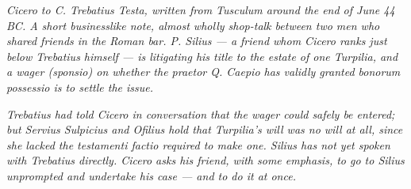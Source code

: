 
\textit{Cicero to C. Trebatius Testa, written from Tusculum around
the end of June 44 BC. A short businesslike note, almost wholly
shop-talk between two men who shared friends in the Roman bar.
P. Silius --- a friend whom Cicero ranks just below Trebatius
himself --- is litigating his title to the estate of one Turpilia,
and a wager (\textit{sponsio}) on whether the praetor Q. Caepio
has validly granted bonorum possessio is to settle the issue.}

\textit{Trebatius had told Cicero in conversation that the wager
could safely be entered; but Servius Sulpicius and Ofilius hold
that Turpilia's will was no will at all, since she lacked the
\textit{testamenti factio} required to make one. Silius has not
yet spoken with Trebatius directly. Cicero asks his friend, with
some emphasis, to go to Silius unprompted and undertake his case
--- and to do it at once.}
